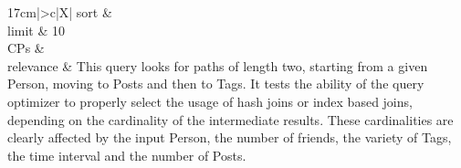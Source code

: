 \begin{tabularx}{17cm}{|>{\small \sf}c|X|}
%
	sort        &
	\vspace{1.1ex} \\ \hline
	limit       & 10 \\ \hline
	CPs &
	 \\ \hline
    relevance &
      \small This query looks for paths of length two, starting from a given Person, moving to Posts and then to Tags. It tests
the ability of the query optimizer to properly select the usage of hash joins or index based joins, depending on the
cardinality of the intermediate results. These cardinalities are clearly affected by the input Person, the number of
friends, the variety of Tags, the time interval and the number of Posts.
 \\ \hline%
\end{tabularx}
\vspace{2ex}